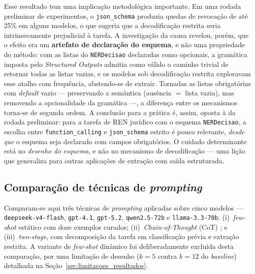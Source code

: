 Esse resultado tem uma implicação metodológica importante. Em uma rodada preliminar de experimentos, o \texttt{json\_schema} produzia quedas de revocação de até 25\% em alguns modelos, o que sugeria que a decodificação restrita seria intrinsecamente prejudicial à tarefa. A investigação da causa revelou, porém, que o efeito era um \textbf{artefato de declaração do esquema}, e não uma propriedade do método: com as listas do \texttt{NERDecisao} declaradas como opcionais, a gramática imposta pelo \textit{Structured Outputs} admitia como válido o caminho trivial de retornar todas as listas vazias, e os modelos sob decodificação restrita exploravam esse atalho com frequência, abstendo-se de extrair. Tornadas as listas obrigatórias com \textit{default} vazio --- preservando a semântica (ausência $=$ lista vazia), mas removendo a opcionalidade da gramática ---, a diferença entre os mecanismos torna-se de segunda ordem. A conclusão para a prática é, assim, oposta à da rodada preliminar: para a tarefa de REN jurídico com o esquema \texttt{NERDecisao}, a escolha entre \texttt{function\_calling} e \texttt{json\_schema} estrito é pouco relevante, \emph{desde que} o esquema seja declarado com campos obrigatórios. O cuidado determinante está no \emph{desenho do esquema}, e não no mecanismo de decodificação --- uma lição que generaliza para outras aplicações de extração com saída estruturada.

\subsection{Comparação de técnicas de \textit{prompting}}
\label{subsec:tecnicas_prompting}

Comparam-se aqui três técnicas de \textit{prompting} aplicadas sobre cinco modelos --- \texttt{deepseek-v4-flash}, \texttt{gpt-4.1}, \texttt{gpt-5.2}, \texttt{qwen2.5-72b} e \texttt{llama-3.3-70b}: (i)~\textit{few-shot} estático com doze exemplos curados; (ii)~\textit{Chain-of-Thought} (CoT) \cite{wei2022chainofthought}; e (iii)~\textit{two-stage}, com decomposição da tarefa em classificação prévia e extração restrita. A variante de \textit{few-shot} dinâmico foi deliberadamente excluída desta comparação, por uma limitação de desenho ($k = 5$ contra $k = 12$ do \textit{baseline}) detalhada na Seção~\ref{sec:limitacoes_resultados}.

